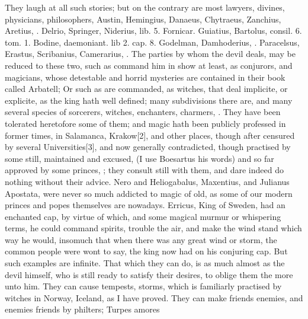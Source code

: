{{They laugh at all such stories; but on the contrary are most lawyers,
divines, physicians, philosophers, Austin, Hemingius, Danaeus,
Chytraeus, Zanchius, Aretius, \etc{}. Delrio, Springer, Niderius,
lib. 5. Fornicar. Guiatius, Bartolus, consil. 6. tom. 1. Bodine,
daemoniant. lib 2. cap. 8. Godelman, Damhoderius, \etc{}. Paracelsus,
Erastus, Scribanius, Camerarius, \etc{}. The parties by whom the devil
deals, may be reduced to these two, such as command him in show at
least, as conjurors, and magicians, whose detestable and horrid
mysteries are contained in their book called Arbatell;  Or
such as are commanded, as witches, that deal  implicite, or
explicite, as the king hath well defined; many subdivisions there
are, and many several species of sorcerers, witches, enchanters,
charmers, \etc{}. They have been tolerated heretofore some of them; and
magic hath been publicly professed in former times, in Salamanca,
Krakow[2\baselineskip], and other places, though after censured by several
Universities[3\baselineskip], and now generally contradicted, though practised by
some still, maintained and excused,  (I
use Boesartus his words) and so far approved by some princes, ; they consult still with them, and dare indeed do nothing
without their advice. Nero and Heliogabalus, Maxentius, and Julianus
Apostata, were never so much addicted to magic of old, as some of our
modern princes and popes themselves are nowadays. Erricus, King of
Sweden, had an enchanted cap, by virtue of which, and some
magical murmur or whispering terms, he could command spirits, trouble
the air, and make the wind stand which way he would, insomuch that when
there was any great wind or storm, the common people were wont to say,
the king now had on his conjuring cap. But such examples are infinite.
That which they can do, is as much almost as the devil himself, who is
still ready to satisfy their desires, to oblige them the more unto him.
They can cause tempests, storms, which is familiarly practised by
witches in Norway, Iceland, as I have proved. They can make friends
enemies, and enemies friends by philters; Turpes amores
}}
